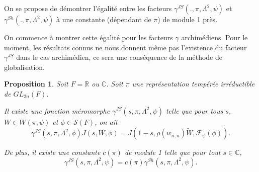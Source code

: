\documentclass{amsart}
\newtheorem{proposition}{Proposition}
\begin{document}
 On se propose de démontrer l'égalité entre les facteurs $\gamma^{JS}(., \pi, \Lambda^2, \psi)$ et $\gamma^{Sh}(., \pi, \Lambda^2, \psi)$ à une constante (dépendant de $\pi$) de module 1 près.
 
 On commence à montrer cette égalité pour les facteurs $\gamma$ archimédiens. Pour le moment, les résultats connus ne nous donnent même pas l'existence du facteur $\gamma^{JS}$ dans le cas archimédien, ce sera une conséquence de la méthode de globalisation.
 
 \begin{proposition}
 Soit $F = \mathbb{R}$ ou $\mathbb{C}$. Soit $\pi$ une représentation tempérée irréductible de $GL_{2n}(F)$. 
 
 Il existe une fonction méromorphe $\gamma^{JS}(s,\pi,\Lambda^2,\psi)$ telle que pour tous $s$, $W \in W(\pi, \psi)$ et $\phi \in \mathcal{S}(F)$, on ait
 \begin{equation}
 \gamma^{JS}(s, \pi, \Lambda^2, \phi) J(s, W, \phi) = J(1-s, \rho(w_{n,n})\tilde{W}, \mathcal{F}_\psi(\phi)).
 \end{equation}
 
 De plus, il existe une constante $c(\pi)$ de module 1 telle que pour tout $s \in \mathbb{C}$,
 \begin{equation}
 \gamma^{JS}(s, \pi, \Lambda^2, \psi) = c(\pi)\gamma^{Sh}(s, \pi, \Lambda^2, \psi).
 \end{equation}
 \end{proposition}
 
\end{document}
